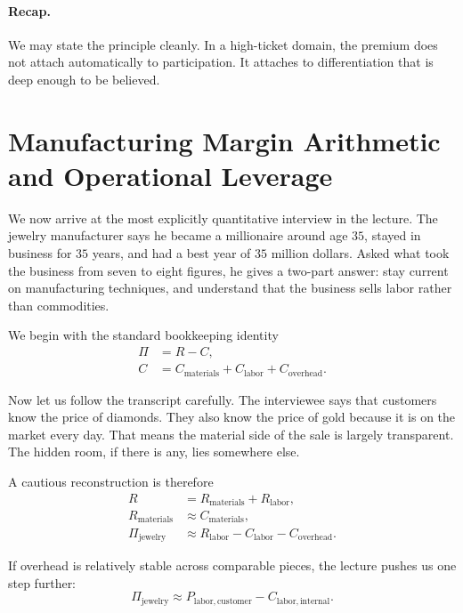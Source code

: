 \paragraph{Recap.} We may state the principle cleanly. In a high-ticket domain, the premium does not attach automatically to participation. It attaches to differentiation that is deep enough to be believed.

\section{Manufacturing Margin Arithmetic and Operational Leverage}

We now arrive at the most explicitly quantitative interview in the lecture. The jewelry manufacturer says he became a millionaire around age \(35\), stayed in business for \(35\) years, and had a best year of \(35\) million dollars. Asked what took the business from seven to eight figures, he gives a two-part answer: stay current on manufacturing techniques, and understand that the business sells labor rather than commodities.

We begin with the standard bookkeeping identity
\begin{align}
\Pi &= R - C,\\
C &= C_{\mathrm{materials}} + C_{\mathrm{labor}} + C_{\mathrm{overhead}}.
\end{align}

Now let us follow the transcript carefully. The interviewee says that customers know the price of diamonds. They also know the price of gold because it is on the market every day. That means the material side of the sale is largely transparent. The hidden room, if there is any, lies somewhere else.

A cautious reconstruction is therefore
\begin{align}
R &= R_{\mathrm{materials}} + R_{\mathrm{labor}},\\
R_{\mathrm{materials}} &\approx C_{\mathrm{materials}},\\
\Pi_{\mathrm{jewelry}} &\approx R_{\mathrm{labor}} - C_{\mathrm{labor}} - C_{\mathrm{overhead}}.
\end{align}

If overhead is relatively stable across comparable pieces, the lecture pushes us one step further:
\begin{equation}
\Pi_{\mathrm{jewelry}} \approx P_{\mathrm{labor,customer}} - C_{\mathrm{labor,internal}}.
\end{equation}

